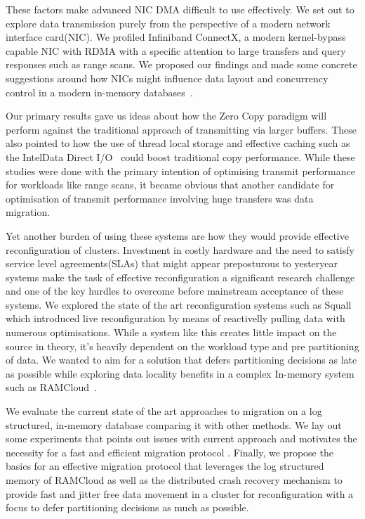 These factors make advanced NIC DMA difficult to use effectively. We set out to explore data 
transmission purely from the perspective of a modern network interface card(NIC). We profiled
Infiniband ConnectX, a modern kernel-bypass capable NIC
with RDMA with a specific attention to large transfers and query responses such as range scans.
We proposed our findings and made some concrete suggestions around how NICs might
influence data layout and concurrency control in a modern in-memory 
databases~\cite{KesavanRicciStutsman:IMDM16}. 

Our primary results gave us ideas about 
how the Zero Copy paradigm will perform against the traditional approach of transmitting via
larger buffers. These also pointed to how the use of thread local storage and effective caching
such as the Intel\textregistered Data Direct I/O~\cite{ddio} could boost traditional copy performance. 
While these studies were done with the primary intention of optimising transmit performance 
for workloads like range scans, it became obvious that another candidate for optimisation 
of transmit performance involving huge transfers was data migration.

Yet another burden of using these systems are how they would provide effective 
reconfiguration of clusters. Investment in costly hardware and the need to satisfy
service level agreements(SLAs) that might appear preposturous to yesteryear systems
make the task of effective reconfiguration a significant research challenge and 
one of the key hurdles to overcome before mainstream acceptance of these systems.
We explored the state of the art reconfiguration systems such as Squall~\cite{squall} which 
introduced live reconfiguration by means of reactivelly pulling data with numerous optimisations.
While a system like this creates little impact on the source in theory, it's heavily dependent 
on the workload type and pre partitioning of data. We wanted to aim for a solution that defers 
partitioning decisions as late as possible while exploring data locality benefits in a complex
In-memory system such as RAMCloud~\cite{ramcloud}.


We evaluate the current state of the art approaches to migration on a log structured, in-memory database
comparing it with other methods. We lay out some experiments that points out issues with current approach
and motivates the necessity for a fast and efficient migration protocol .
Finally, we propose the basics for an effective migration protocol that leverages
the log structured memory of RAMCloud as well as the distributed crash recovery mechanism
to provide fast and jitter free data movement in a cluster for reconfiguration with a focus to
defer partitioning decisions as much as possible.

